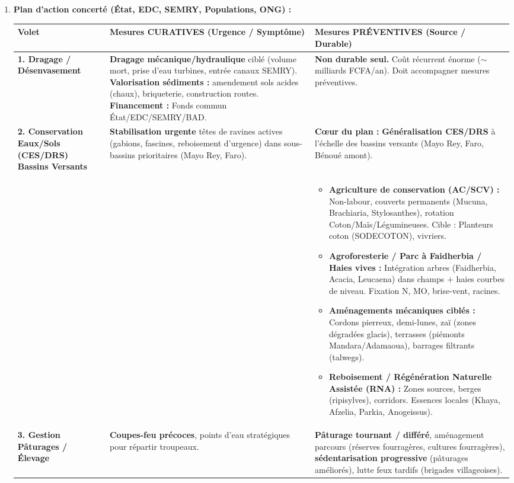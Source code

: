 \documentclass[11pt]{article}
\begin{document}
\begin{corrige}
\begin{enumerate}
    \item \textbf{Plan d'action concerté (État, EDC, SEMRY, Populations, ONG) :}
    \begin{center}
    \begin{tabularx}{\linewidth}{|>{\bfseries}l|X|X|}\hline
    \textbf{Volet} & \textbf{Mesures CURATIVES (Urgence / Symptôme)} & \textbf{Mesures PRÉVENTIVES (Source / Durable)} \\ \hline
    \textbf{1. Dragage / Désenvasement} & \textbf{Dragage mécanique/hydraulique} ciblé (volume mort, prise d'eau turbines, entrée canaux SEMRY). \textbf{Valorisation sédiments :} amendement sols acides (chaux), briqueterie, construction routes. \textbf{Financement :} Fonds commun État/EDC/SEMRY/BAD. & \textbf{Non durable seul.} Coût récurrent énorme ($\sim$ milliards FCFA/an). Doit accompagner mesures préventives. \\ \hline
    \textbf{2. Conservation Eaux/Sols (CES/DRS) Bassins Versants} & \textbf{Stabilisation urgente} têtes de ravines actives (gabions, fascines, reboisement d'urgence) dans sous-bassins prioritaires (Mayo Rey, Faro). & \textbf{Cœur du plan :} \textbf{Généralisation CES/DRS} à l'échelle des bassins versants (Mayo Rey, Faro, Bénoué amont). \\
    & & \begin{itemize}
        \item \textbf{Agriculture de conservation (AC/SCV) :} Non-labour, couverts permanents (Mucuna, Brachiaria, Stylosanthes), rotation Coton/Maïs/Légumineuses. Cible : Planteurs coton (SODECOTON), vivriers.
        \item \textbf{Agroforesterie / Parc à Faidherbia / Haies vives :} Intégration arbres (Faidherbia, Acacia, Leucaena) dans champs + haies courbes de niveau. Fixation N, MO, brise-vent, racines.
        \item \textbf{Aménagements mécaniques ciblés :} Cordons pierreux, demi-lunes, zaï (zones dégradées glacis), terrasses (piémonts Mandara/Adamaoua), barrages filtrants (talwegs).
        \item \textbf{Reboisement / Régénération Naturelle Assistée (RNA) :} Zones sources, berges (ripisylves), corridors. Essences locales (Khaya, Afzelia, Parkia, Anogeissus).
    \end{itemize} \\ \hline
    \textbf{3. Gestion Pâturages / Élevage} & \textbf{Coupes-feu précoces}, points d'eau stratégiques pour répartir troupeaux. & \textbf{Pâturage tournant / différé}, aménagement parcours (réserves fourragères, cultures fourragères), \textbf{sédentarisation progressive} (pâturages améliorés), lutte feux tardifs (brigades villageoises). \\ \hline

\end{tabularx}
\end{center}
\end{enumerate}
\end{corrige}
\end{document}
